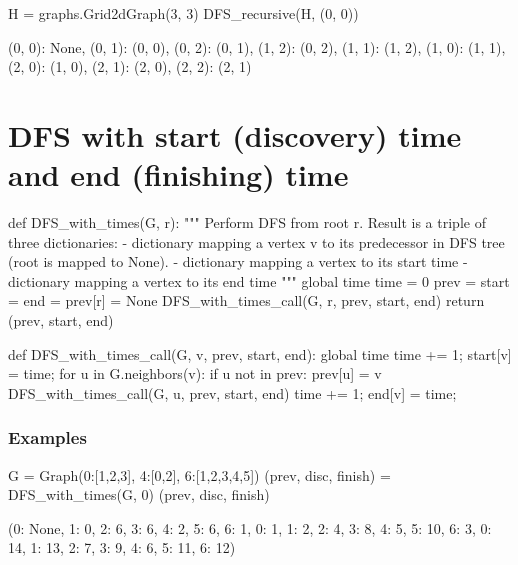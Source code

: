 \begin{sageCell}
   H = graphs.Grid2dGraph(3, 3)
   DFS_recursive(H, (0, 0))
\end{sageCell}
\begin{outCell}
   {(0, 0): None,
    (0, 1): (0, 0),
    (0, 2): (0, 1),
    (1, 2): (0, 2),
    (1, 1): (1, 2),
    (1, 0): (1, 1),
    (2, 0): (1, 0),
    (2, 1): (2, 0),
    (2, 2): (2, 1)}
\end{outCell}

\section{DFS with start (discovery) time and end (finishing) time}

\begin{sageCell}
def DFS_with_times(G, r):
    """
    Perform DFS from root r. Result is a triple of three dictionaries:
    - dictionary mapping a vertex v to its predecessor in DFS tree
      (root is mapped to None).
    - dictionary mapping a vertex to its start time
    - dictionary mapping a vertex to its end time
    """
    global time
    time = 0
    prev = {}
    start = {}
    end = {}
    prev[r] = None
    DFS_with_times_call(G, r, prev, start, end)
    return (prev, start, end)

def DFS_with_times_call(G, v, prev, start, end):
    global time
    time += 1;
    start[v] = time;
    for u in G.neighbors(v):
        if u not in prev:
            prev[u] = v
            DFS_with_times_call(G, u, prev, start, end)
    time += 1;
    end[v] = time;
\end{sageCell}

\subsubsection*{Examples}

\begin{sageCell}
   G = Graph({0:[1,2,3], 4:[0,2], 6:[1,2,3,4,5]})
   (prev, disc, finish) = DFS_with_times(G, 0)
   (prev, disc, finish)
\end{sageCell}
\begin{outCell}
   ({0: None, 1: 0, 2: 6, 3: 6, 4: 2, 5: 6, 6: 1},
    {0: 1, 1: 2, 2: 4, 3: 8, 4: 5, 5: 10, 6: 3},
    {0: 14, 1: 13, 2: 7, 3: 9, 4: 6, 5: 11, 6: 12})
\end{outCell}

